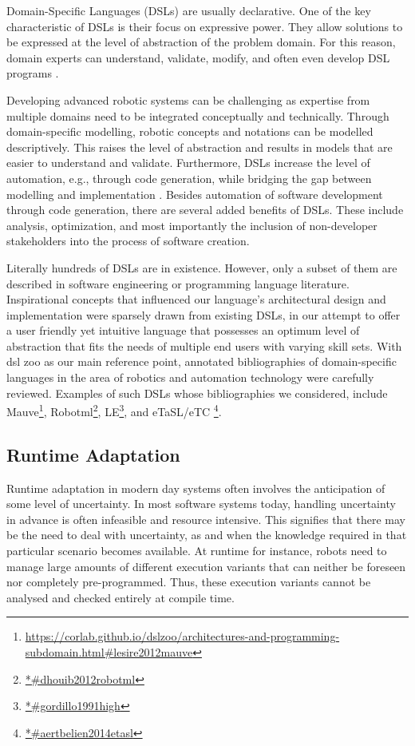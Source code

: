 \documentclass[conference]{IEEEtran}
\newcommand{\foot}[1]{\footnote{\url{#1}}}
\begin{document}
Domain-Specific Languages (DSLs) are usually declarative. One of the key characteristic of DSLs is their focus on expressive power. They allow solutions to be expressed at the level of abstraction of the problem domain. For this reason, domain experts can understand, validate, modify, and often even develop DSL programs \cite{dsl}.

Developing advanced robotic systems can be challenging as expertise from multiple domains need to be integrated conceptually and technically. Through domain-speciﬁc modelling, robotic concepts and notations can be modelled descriptively. This raises the level of abstraction and results in models that are easier to understand and validate. Furthermore, DSLs increase the level of automation, e.g., through code generation, while bridging the gap between modelling and implementation \cite{dsl-robo}. Besides automation of software development through code generation, there are several added benefits of DSLs. These include analysis, optimization, and most importantly the inclusion of non-developer stakeholders into the process of software creation.

Literally hundreds of DSLs are in existence. However, only a subset of them are described in software engineering or programming language literature. Inspirational concepts that influenced our language's architectural design and implementation were sparsely drawn from existing DSLs, in our attempt to offer a user friendly yet intuitive language that possesses an optimum level of abstraction that fits the needs of multiple end users with varying skill sets. With dsl zoo \cite{dsl-robo} as our main reference point, annotated bibliographies of domain-specific languages in the area of robotics and automation technology were carefully reviewed. Examples of such DSLs whose bibliographies we considered, include Mauve\foot{https://corlab.github.io/dslzoo/architectures-and-programming-subdomain.html#lesire2012mauve}, Robotml\foot{*#dhouib2012robotml}, LE\foot{*#gordillo1991high}, and eTaSL/eTC \foot{*#aertbelien2014etasl}.

\subsection{Runtime Adaptation}
Runtime adaptation in modern day systems often involves the anticipation of some level of uncertainty. In most software systems today, handling uncertainty in advance is often infeasible and resource intensive. This signifies that there may be the need to deal with uncertainty, as and when the knowledge required in that particular scenario becomes available. At runtime for instance, robots need to manage large amounts of different execution variants that can neither be foreseen nor completely pre-programmed. Thus, these execution variants cannot be analysed and checked entirely at compile time.
\end{document}
